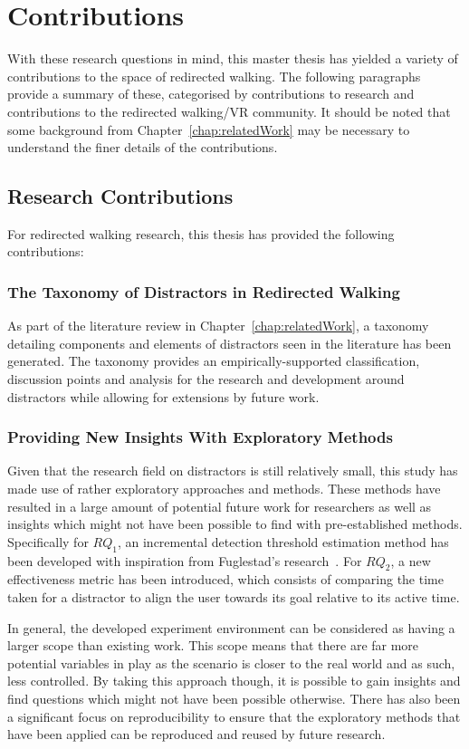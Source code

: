 \section{Contributions}
With these research questions in mind, this master thesis has yielded a variety of contributions to the space of redirected walking. The following paragraphs provide a summary of these, categorised by contributions to research and contributions to the redirected walking/VR community. It should be noted that some background from Chapter~\ref{chap:relatedWork} may be necessary to understand the finer details of the contributions.

\subsection{Research Contributions}
For redirected walking research, this thesis has provided the following contributions: 

\subsubsection{The Taxonomy of Distractors in Redirected Walking}
As part of the literature review in Chapter~\ref{chap:relatedWork}, a taxonomy detailing components and elements of distractors seen in the literature has been generated. The taxonomy provides an empirically-supported classification, discussion points and analysis for the research and development around distractors while allowing for extensions by future work. 

\subsubsection{Providing New Insights With Exploratory Methods}
Given that the research field on distractors is still relatively small, this study has made use of rather exploratory approaches and methods. These methods have resulted in a large amount of potential future work for researchers as well as insights which might not have been possible to find with pre-established methods. Specifically for $RQ_1$, an incremental detection threshold estimation method has been developed with inspiration from Fuglestad's research~\cite{fuglestad2018redirected}. For $RQ_2$, a new effectiveness metric has been introduced, which consists of comparing the time taken for a distractor to align the user towards its goal relative to its active time. 

In general, the developed experiment environment can be considered as having a larger scope than existing work. This scope means that there are far more potential variables in play as the scenario is closer to the real world and as such, less controlled. By taking this approach though, it is possible to gain insights and find questions which might not have been possible otherwise. There has also been a significant focus on reproducibility to ensure that the exploratory methods that have been applied can be reproduced and reused by future research. 

